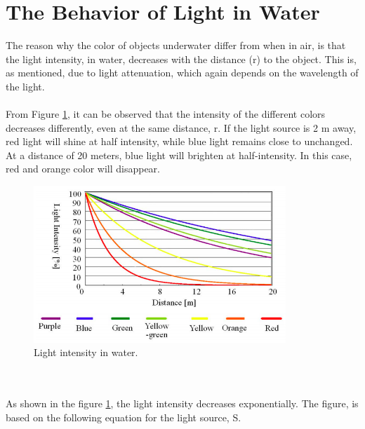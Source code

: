 \vspace{1.3cm}
\section{The Behavior of Light in Water}\label{lightinwater}
The reason why the color of objects underwater differ from when in air, is that the light intensity, in water, decreases with the distance (r) to the object. This is, as mentioned, due to light attenuation, which again depends on the wavelength of the light. %
\\\\
From Figure \ref{fig:lightinwater}, it can be observed that the intensity of the different colors decreases differently, even at the same distance, r. If the light source is 2 m away, red light will shine at half intensity, while blue light remains close to unchanged. At a distance of 20 meters, blue light will brighten at half-intensity. In this case, red and orange color will disappear.
\begin{figure}[H]
\centering
  \includegraphics[width=9.5cm]{Images/theory/intensity.png}
  \caption{Light intensity in water.}
  \label{fig:lightinwater}
\end{figure}
\\\\
\noindent
As shown in the figure \ref{fig:lightinwater}, the light intensity decreases exponentially. The figure, is based on the following equation for the light source, S. 


